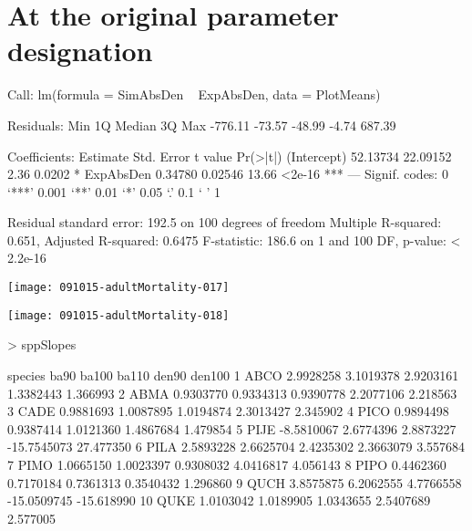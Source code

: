 \documentclass{article}
\begin{document}
\section{At the original parameter designation}
\begin{Schunk}
\begin{Soutput}
Call:
lm(formula = SimAbsDen ~ ExpAbsDen, data = PlotMeans)

Residuals:
    Min      1Q  Median      3Q     Max 
-776.11  -73.57  -48.99   -4.74  687.39 

Coefficients:
            Estimate Std. Error t value Pr(>|t|)    
(Intercept) 52.13734   22.09152    2.36   0.0202 *  
ExpAbsDen    0.34780    0.02546   13.66   <2e-16 ***
---
Signif. codes:  0 ‘***’ 0.001 ‘**’ 0.01 ‘*’ 0.05 ‘.’ 0.1 ‘ ’ 1

Residual standard error: 192.5 on 100 degrees of freedom
Multiple R-squared:  0.651,	Adjusted R-squared:  0.6475 
F-statistic: 186.6 on 1 and 100 DF,  p-value: < 2.2e-16
\end{Soutput}
\end{Schunk}
\texttt{[image: 091015-adultMortality-017]}

\texttt{[image: 091015-adultMortality-018]}
\begin{Schunk}
\begin{Sinput}
>   sppSlopes
\end{Sinput}
\begin{Soutput}
   species       ba90     ba100     ba110       den90     den100
1     ABCO  2.9928258 3.1019378 2.9203161   1.3382443   1.366993
2     ABMA  0.9303770 0.9334313 0.9390778   2.2077106   2.218563
3     CADE  0.9881693 1.0087895 1.0194874   2.3013427   2.345902
4     PICO  0.9894498 0.9387414 1.0121360   1.4867684   1.479854
5     PIJE -8.5810067 2.6774396 2.8873227 -15.7545073  27.477350
6     PILA  2.5893228 2.6625704 2.4235302   2.3663079   3.557684
7     PIMO  1.0665150 1.0023397 0.9308032   4.0416817   4.056143
8     PIPO  0.4462360 0.7170184 0.7361313   0.3540432   1.296860
9     QUCH  3.8575875 6.2062555 4.7766558 -15.0509745 -15.618990
10    QUKE  1.0103042 1.0189905 1.0343655   2.5407689   2.577005
\end{Soutput}
\end{Schunk}





\newpage
\end{document}
